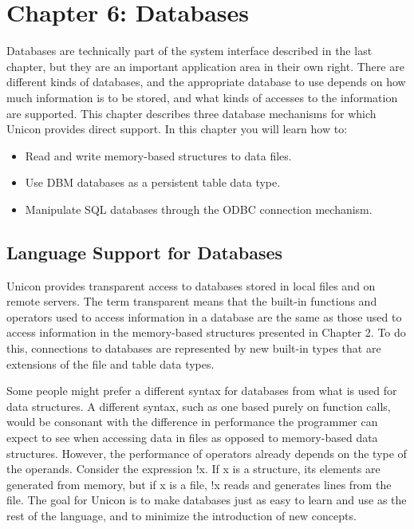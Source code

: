 \clearpage\section{Chapter 6: Databases}

Databases are technically part of the system interface
described in the last chapter, but they are an important application
area in their own right. There are different kinds of databases, and
the appropriate database to use depends on how much information is to
be stored, and what kinds of accesses to the information are supported.
This chapter describes three database mechanisms for which Unicon
provides direct support. In this chapter you will learn how to:

\begin{itemize}
\item Read and write memory-based structures to data files.
\item Use DBM databases as a persistent table data type.
\item Manipulate SQL databases through the ODBC connection mechanism.
\end{itemize}
\subsection{Language Support for Databases}
Unicon provides transparent access to databases stored in local files
and on remote servers. The term
{\textquotedbl}transparent{\textquotedbl} means that the built-in
functions and operators used to access information in a database are
the same as those used to access information in the memory-based
structures presented in Chapter 2. To do this, connections to databases
are represented by new built-in types that are extensions of the file
and table data types.

Some people might prefer a different syntax for databases from what is
used for data structures. A different syntax, such as one based purely
on function calls, would be consonant with the difference in
performance the programmer can expect to see when accessing data in
files as opposed to memory-based data structures. However, the
performance of operators already depends on the type of the operands.
Consider the expression \textsf{!x}. If \textsf{x} is a structure, its
elements are generated from memory, but if \textsf{x} is a file,
\textsf{!x} reads and generates lines from the file. The goal for
Unicon is to make databases just as easy to learn and use as the rest
of the language, and to minimize the introduction of new concepts.


